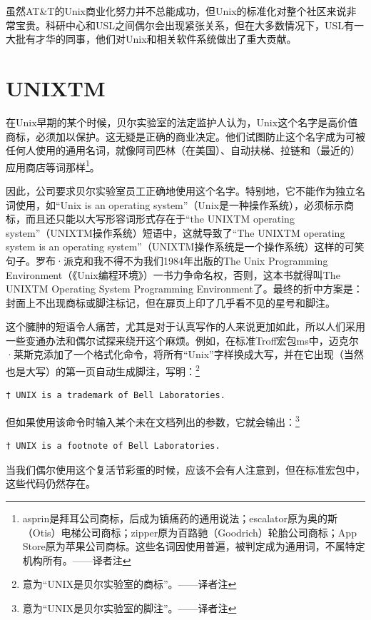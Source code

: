 \documentclass[a4paper,12pt,UTF8,twoside]{ctexbook}
\begin{document}
虽然AT\&T的Unix商业化努力并不总能成功，但Unix的标准化对整个社区来说非常宝贵。科研中心和USL之间偶尔会出现紧张关系，但在大多数情况下，USL有一大批有才华的同事，他们对Unix和相关软件系统做出了重大贡献。

\section{UNIXTM}

在Unix早期的某个时候，贝尔实验室的法定监护人认为，Unix这个名字是高价值商标，必须加以保护。这无疑是正确的商业决定。他们试图防止这个名字成为可被任何人使用的通用名词，就像阿司匹林（在美国）、自动扶梯、拉链和（最近的）应用商店等词那样\footnote{asprin是拜耳公司商标，后成为镇痛药的通用说法；escalator原为奥的斯（Otis）电梯公司商标；zipper原为百路驰（Goodrich）轮胎公司商标；App Store原为苹果公司商标。这些名词因使用普遍，被判定成为通用词，不属特定机构所有。——译者注}。

因此，公司要求贝尔实验室员工正确地使用这个名字。特别地，它不能作为独立名词使用，如“Unix is an operating system”（Unix是一种操作系统），必须标示商标，而且还只能以大写形容词形式存在于“the UNIXTM operating system”（UNIXTM操作系统）短语中，这就导致了“The UNIXTM operating system is an operating system”（UNIXTM操作系统是一个操作系统）这样的可笑句子。罗布·派克和我不得不为我们1984年出版的The Unix Programming Environment（《Unix编程环境》）一书力争命名权，否则，这本书就得叫The UNIXTM Operating System Programming Environment了。最终的折中方案是：封面上不出现商标或脚注标记，但在扉页上印了几乎看不见的星号和脚注。

这个臃肿的短语令人痛苦，尤其是对于认真写作的人来说更加如此，所以人们采用一些变通办法和偶尔试探来绕开这个麻烦。例如，在标准Troff宏包ms中，迈克尔·莱斯克添加了一个格式化命令，将所有“Unix”字样换成大写，并在它出现（当然也是大写）的第一页自动生成脚注，写明：\footnote{意为“UNIX是贝尔实验室的商标”。——译者注}

\begin{lstlisting}
† UNIX is a trademark of Bell Laboratories.
\end{lstlisting}

但如果使用该命令时输入某个未在文档列出的参数，它就会输出：\footnote{意为“UNIX是贝尔实验室的脚注”。——译者注}

\begin{lstlisting}
† UNIX is a footnote of Bell Laboratories.
\end{lstlisting}

当我们偶尔使用这个复活节彩蛋的时候，应该不会有人注意到，但在标准宏包中，这些代码仍然存在。
\end{document}
